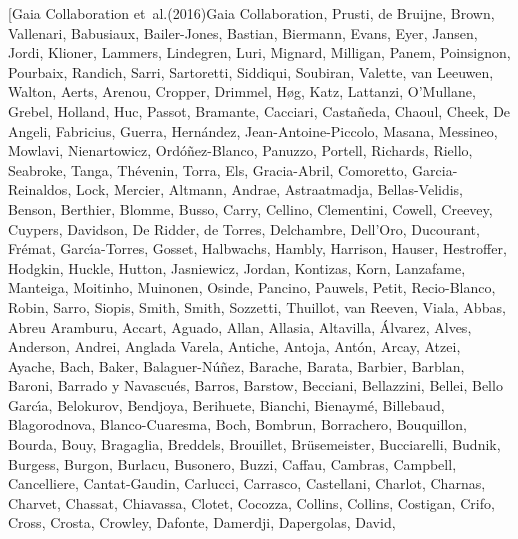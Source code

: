\documentclass{aa}
\begin{document}
\begin{thebibliography}{242}
\bibitem[{{Gaia Collaboration} {et~al.}(2016{}){Gaia
  Collaboration}, {Prusti}, {de Bruijne}, {Brown}, {Vallenari}, {Babusiaux},
  {Bailer-Jones}, {Bastian}, {Biermann}, {Evans}, {Eyer}, {Jansen}, {Jordi},
  {Klioner}, {Lammers}, {Lindegren}, {Luri}, {Mignard}, {Milligan}, {Panem},
  {Poinsignon}, {Pourbaix}, {Randich}, {Sarri}, {Sartoretti}, {Siddiqui},
  {Soubiran}, {Valette}, {van Leeuwen}, {Walton}, {Aerts}, {Arenou}, {Cropper},
  {Drimmel}, {H{\o}g}, {Katz}, {Lattanzi}, {O'Mullane}, {Grebel}, {Holland},
  {Huc}, {Passot}, {Bramante}, {Cacciari}, {Casta{\~n}eda}, {Chaoul}, {Cheek},
  {De Angeli}, {Fabricius}, {Guerra}, {Hern{\'a}ndez}, {Jean-Antoine-Piccolo},
  {Masana}, {Messineo}, {Mowlavi}, {Nienartowicz}, {Ord{\'o}{\~n}ez-Blanco},
  {Panuzzo}, {Portell}, {Richards}, {Riello}, {Seabroke}, {Tanga},
  {Th{\'e}venin}, {Torra}, {Els}, {Gracia-Abril}, {Comoretto},
  {Garcia-Reinaldos}, {Lock}, {Mercier}, {Altmann}, {Andrae}, {Astraatmadja},
  {Bellas-Velidis}, {Benson}, {Berthier}, {Blomme}, {Busso}, {Carry},
  {Cellino}, {Clementini}, {Cowell}, {Creevey}, {Cuypers}, {Davidson}, {De
  Ridder}, {de Torres}, {Delchambre}, {Dell'Oro}, {Ducourant}, {Fr{\'e}mat},
  {Garc{\'{\i}}a-Torres}, {Gosset}, {Halbwachs}, {Hambly}, {Harrison},
  {Hauser}, {Hestroffer}, {Hodgkin}, {Huckle}, {Hutton}, {Jasniewicz},
  {Jordan}, {Kontizas}, {Korn}, {Lanzafame}, {Manteiga}, {Moitinho},
  {Muinonen}, {Osinde}, {Pancino}, {Pauwels}, {Petit}, {Recio-Blanco}, {Robin},
  {Sarro}, {Siopis}, {Smith}, {Smith}, {Sozzetti}, {Thuillot}, {van Reeven},
  {Viala}, {Abbas}, {Abreu Aramburu}, {Accart}, {Aguado}, {Allan}, {Allasia},
  {Altavilla}, {{\'A}lvarez}, {Alves}, {Anderson}, {Andrei}, {Anglada Varela},
  {Antiche}, {Antoja}, {Ant{\'o}n}, {Arcay}, {Atzei}, {Ayache}, {Bach},
  {Baker}, {Balaguer-N{\'u}{\~n}ez}, {Barache}, {Barata}, {Barbier}, {Barblan},
  {Baroni}, {Barrado y Navascu{\'e}s}, {Barros}, {Barstow}, {Becciani},
  {Bellazzini}, {Bellei}, {Bello Garc{\'{\i}}a}, {Belokurov}, {Bendjoya},
  {Berihuete}, {Bianchi}, {Bienaym{\'e}}, {Billebaud}, {Blagorodnova},
  {Blanco-Cuaresma}, {Boch}, {Bombrun}, {Borrachero}, {Bouquillon}, {Bourda},
  {Bouy}, {Bragaglia}, {Breddels}, {Brouillet}, {Br{\"u}semeister},
  {Bucciarelli}, {Budnik}, {Burgess}, {Burgon}, {Burlacu}, {Busonero}, {Buzzi},
  {Caffau}, {Cambras}, {Campbell}, {Cancelliere}, {Cantat-Gaudin}, {Carlucci},
  {Carrasco}, {Castellani}, {Charlot}, {Charnas}, {Charvet}, {Chassat},
  {Chiavassa}, {Clotet}, {Cocozza}, {Collins}, {Collins}, {Costigan}, {Crifo},
  {Cross}, {Crosta}, {Crowley}, {Dafonte}, {Damerdji}, {Dapergolas}, {David},
}
\end{thebibliography}
\end{document}

